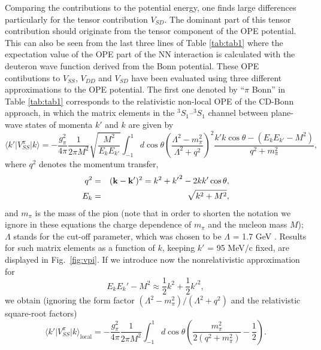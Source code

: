Comparing the contributions to the potential energy, 
one finds large differences
particularly for the tensor contribution $V_{SD}$. The dominant part of this 
tensor contribution should originate from the tensor component of the OPE
potential. This can also be seen from the last three lines of Table
\ref{tab:tab1} where the expectation value of 
the OPE part of the NN interaction
is calculated with the deuteron wave function derived from the Bonn
potential. These OPE contibutions to $V_{SS}$, $V_{DD}$ and $V_{SD}$ have been
evaluated using three different approximations to the OPE potential. 
The first one denoted by ``$\pi$
Bonn'' in Table \ref{tab:tab1} 
corresponds to the relativistic non-local OPE of the CD-Bonn
approach, in which the matrix elements in the
$^3S_1$--$^3S_1$ channel between plane-wave states of momenta $k'$ and $k$ 
are given by
\begin{equation}
        \langle k'\vert V_{SS}^\pi \vert k \rangle = 
         -\frac{g_\pi^2}{4\pi}\frac{1}{2\pi M^2}
         \sqrt{\frac{M^2}{E_kE_{k'}}} \int_{-1}^1 d \cos \theta 
          \left( \frac{\Lambda^2 -m_\pi^2}{\Lambda^2 + q^2}\right)^2 
         \frac{k'k\cos\theta - (E_kE_{k'}-M^2)}{q^2 + m_\pi^2},
\label{eq:vpi1}
\end{equation}
where $q^2$ denotes the momentum transfer,
\begin{eqnarray}
        q^2 & = & ({\bf k}-{\bf k'})^2 = k^2 + 
                {k'}^2 - 2 k k' \cos\theta,\nonumber \\
        E_k & = & \sqrt{k^2 + M^2},
\label{eq:momtra}
\end{eqnarray}
and 
$m_\pi$ is the mass of the pion 
(note that in order to shorten the notation we 
ignore in these equations the charge dependence of $m_\pi$ 
and the nucleon mass 
$M$); $\Lambda$ stands for the cut-off parameter, which was chosen to be
$\Lambda$ = 1.7 GeV \cite{cdbonn}. Results for such matrix 
elements as a function
of $k$, keeping $k'$ = 95 MeV/c fixed, are displayed 
in Fig.\ \ref{fig:vpi}. 
If we introduce now the nonrelativistic approximation for
\begin{equation}
     E_kE_k' - M^2 \approx \frac12 k^2 + \frac12 {k'}^2,
\label{eq:rel}
\end{equation}
we obtain
(ignoring the form factor $(\Lambda^2 -m_\pi^2)/(\Lambda^2 + q^2)$
and the relativistic square-root factors)
\begin{equation}
      \langle k'\vert V_{SS}^\pi \vert k \rangle_{\mbox{local}} = 
      - \frac{g_\pi^2}{4\pi}\frac{1}{2\pi M^2}\int_{-1}^1 d \cos \theta 
        \left(\frac{m_\pi^2}{2(q^2+m_\pi^2)} - 
        \frac{1}{2}\right). 
\label{eq:vpi2}
\end{equation}
